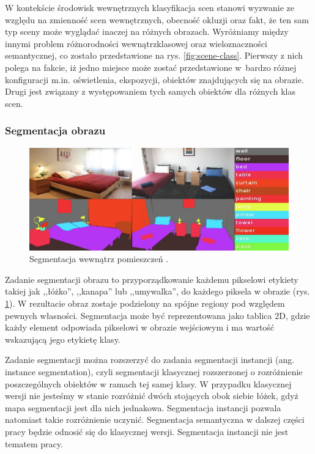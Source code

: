 W kontekście środowisk wewnętrznych klasyfikacja scen stanowi wyzwanie ze względu na zmienność scen wewnętrznych, obecność okluzji oraz fakt, że ten sam typ sceny może wyglądać inaczej na różnych obrazach. Wyróżniamy między innymi problem różnorodności wewnątrzklasowej oraz wieloznaczności semantycznej, co zostało przedstawione na rys. \ref{fig:scene-class}. Pierwszy z nich polega na fakcie, iż jedno miejsce może zostać przedstawione w~bardzo różnej konfiguracji m.in. oświetlenia, ekspozycji, obiektów znajdujących się na obrazie. Drugi jest związany z występowaniem tych samych obiektów dla różnych klas scen.

\subsubsection{Segmentacja obrazu}
\begin{figure}[ht!]
    \includegraphics[width=\textwidth]{img/segment.png}
    \caption{Segmentacja wewnątrz pomieszczeń \cite{zhang2018context}.}
    \label{fig:segment}
  \end{figure}
  
Zadanie segmentacji obrazu to przyporządkowanie każdemu pikselowi etykiety takiej jak ,,łóżko'', ,,kanapa'' lub ,,umywalka'', do każdego piksela w obrazie (rys. \ref{fig:segment}). W rezultacie obraz zostaje podzielony na spójne regiony pod względem pewnych własności. Segmentacja może być reprezentowana jako tablica 2D, gdzie każdy element odpowiada pikselowi w obrazie wejściowym i ma wartość wskazującą jego etykietę klasy.

Zadanie segmentacji można rozszerzyć do zadania segmentacji instancji (ang. instance segmentation), czyli segmentacji klasycznej rozszerzonej o rozróżnienie poszczególnych obiektów w ramach tej samej klasy. W przypadku klasycznej wersji nie jesteśmy w stanie rozróżnić dwóch stojących obok siebie łóżek, gdyż mapa segmentacji jest dla nich jednakowa. Segmentacja instancji pozwala natomiast takie rozróżnienie uczynić. Segmentacja semantyczna w dalszej części pracy będzie odnosić się do klasycznej wersji. Segmentacja instancji nie jest tematem pracy.

